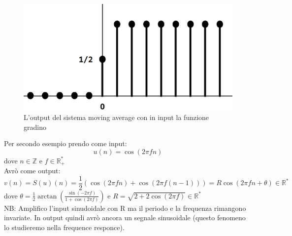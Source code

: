 \begin{figure}[h]
	\centering
	\includegraphics[scale=0.5]{immagini/gradinoMedia}
	\caption{ L'output del sistema moving average con in input la funzione gradino}
	\label{fig: Output sistema moving average gradino}
\end{figure}
Per secondo esempio prendo come input:
\begin{equation*}
u(n)= \cos(2\pi f n)
\end{equation*}
dove $n \in \mathbb{Z} $ e $f \in \mathbb{R}_{+}^{*}$\\
Avrò come output:
\begin{equation*}
v(n)= S(u)(n) = \frac{1}{2} (\cos(2\pi f n) + \cos(2\pi f (n-1))) = R\cos( 2\pi f n + \theta) \in \mathbb{R}^{*}
\end{equation*}
dove $\theta = \frac{1}{2} \arctan(\frac{ \sin (-2\pi f)    }{1+\cos(2\pi f)})$ e $ R = \sqrt{ 2+2\cos(2\pi f)} \in \mathbb{R}^{*}$\\
NB: Amplifico l'input sinudoidale con R ma il periodo e la frequenza rimangono invariate. In output quindi avrò ancora un segnale sinusoidale (questo fenomeno lo studieremo nella frequence responce).
